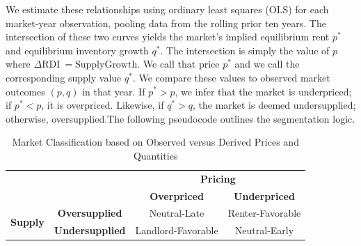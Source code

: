 \documentclass[APA,Times1COL]{WileyNJDv5} %
\begin{document}
 We estimate these relationships using ordinary least squares (OLS) for each market-year observation, pooling data from the rolling prior ten years. The intersection of these two curves yields the market's implied equilibrium rent \( p^* \) and equilibrium inventory growth \( q^* \). The intersection is simply the value of \(p\) where \(\Delta \text{RDI}\ = \text{SupplyGrowth} \). We call that price \( p^* \) and we call the corresponding supply value \( q^* \). We compare these values to observed market outcomes \( (p, q) \) in that year. If \( p^* > p \), we infer that the market is underpriced; if \( p^* < p \), it is overpriced. Likewise, if \( q^* > q \), the market is deemed undersupplied; otherwise, oversupplied.The following pseudocode outlines the segmentation logic.
 
 \begin{table}[h!]
 	\centering
 	\caption{Market Classification based on Observed versus Derived Prices and Quantities}
 	\begin{tabular}{cc|c|c|}
 		\multicolumn{2}{c}{} & \multicolumn{2}{c}{\textbf{Pricing}} \\
 		\multicolumn{2}{c}{} & \textbf{Overpriced} & \textbf{Underpriced} \\
 		\cmidrule{3-4}
 		\multirow{2}{*}{\textbf{Supply}} & \textbf{Oversupplied} & Neutral-Late  & Renter-Favorable \\
 		\cmidrule{2-4}
 		& \textbf{Undersupplied} & Landlord-Favorable & Neutral-Early \\
 		\bottomrule
 	\end{tabular}
 \end{table}
 
\end{document}
